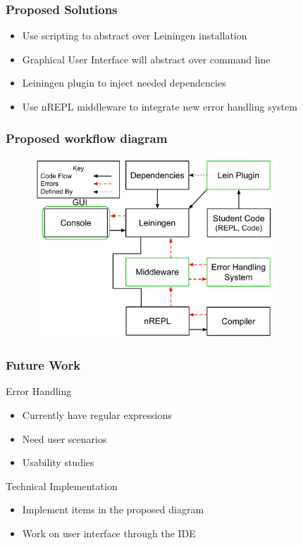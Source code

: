 \documentclass{beamer}
\begin{document}
\begin{frame}
\frametitle{Proposed Solutions}
	\begin{itemize}
		\item Use scripting to abstract over Leiningen installation
		\item Graphical User Interface will abstract over command line
		\item Leiningen plugin to inject needed dependencies
		\item Use nREPL middleware to integrate new error handling system
	\end{itemize}
\end{frame}

\begin{frame}[fragile]
\frametitle{Proposed workflow diagram}
\begin{figure}[h]
 \includegraphics[width=9cm]{../OurErrorHandlingSystem.pdf}
 \centering
\end{figure}
\end{frame}

\begin{frame}
\frametitle{Future Work}
	Error Handling	
	\begin{itemize}
		\item Currently have regular expressions
		\item Need user scenarios
		\item Usability studies
	\end{itemize}
	Technical Implementation
	\begin{itemize}
		\item Implement items in the proposed diagram
		\item Work on user interface through the IDE
	\end{itemize}
\end{frame}
\end{document}
